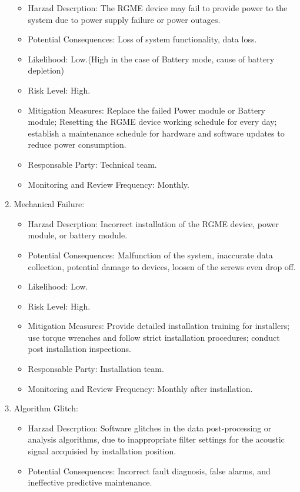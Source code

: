 \documentclass{article}
\begin{document}
\begin{enumerate}
    \begin{itemize}
        \item Harzad Descrption: The RGME device may fail to provide power to the system due to power supply failure or power outages.
        \item Potential Consequences: Loss of system functionality, data loss.
        \item Likelihood: Low.(High in the case of Battery mode, cause of battery depletion)
        \item Risk Level: High.
        \item Mitigation Measures: Replace the failed Power module or Battery module; Resetting the RGME device working schedule for every day; establish a maintenance schedule for hardware and software updates to reduce power consumption.
        \item Responsable Party: Technical team.
        \item Monitoring and Review Frequency: Monthly.
    \end{itemize}
    \item Mechanical Failure:
    \begin{itemize}
        \item Harzad Descrption: Incorrect installation of the RGME device, power module, or battery module.
        \item Potential Consequences: Malfunction of the system, inaccurate data collection, potential damage to devices, loosen of the screws even drop off.
        \item Likelihood: Low.
        \item Risk Level: High.
        \item Mitigation Measures: Provide detailed installation training for installers; use torque wrenches and follow strict installation procedures; conduct post installation inspections.
        \item Responsable Party: Installation team.
        \item Monitoring and Review Frequency: Monthly after installation.
    \end{itemize}
    \item Algorithm Glitch:
    \begin{itemize}
        \item Harzad Descrption: Software glitches in the data post-processing or analysis algorithms, due to inappropriate filter settings for the acoustic signal accquisied by installation position.
        \item Potential Consequences: Incorrect fault diagnosis, false alarms, and ineffective predictive maintenance.

\end{itemize}
\end{enumerate}
\end{document}
